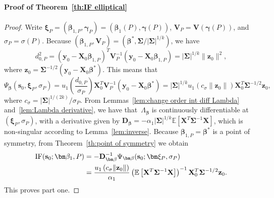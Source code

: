 \documentclass{article}
\numberwithin{equation}{section}
\theoremstyle{plain}
\newcommand{\bbeta}{\bm\beta}
\newcommand{\bxi}{\bm\xi}
\newcommand{\bgamma}{\bm\gamma}
\newcommand{\bSigma}{\mathbf{\Sigma}}
\newcommand{\by}{\mathbf{y}}
\newcommand{\bs}{\mathbf{s}}
\newcommand{\bz}{\mathbf{z}}
\newcommand{\bX}{\mathbf{X}}
\newcommand{\bV}{\mathbf{V}}
\newcommand{\bD}{\mathbf{D}}
\newcommand{\E}{\mathbb{E}}
\begin{document}
\paragraph*{Proof of Theorem~\ref{th:IF elliptical}}
\begin{proof}
Write $\bxi_P=(\bbeta_{1,P},\bgamma_P)=(\bbeta_1(P),\bgamma(P))$,
$\bV_P=\bV(\bgamma(P))$, and $\sigma_P=\sigma(P)$.
Because $(\bbeta_{1,P},\bV_P)=(\bbeta^*,\bSigma/|\bSigma|^{1/k})$,
we have
\[
d_{0,P}^2
=
(\by_0-\bX_0\bbeta_{1,P})^T\bV_P^{-1}(\by_0-\bX_0\bbeta_{1,P})
=
|\bSigma|^{1/k}\|\bz_0\|^2,
\]
where $\bz_0=\bSigma^{-1/2}(\by_0-\bX_0\bbeta^*)$.
This means that
\[
\Psi_{\bbeta}(\bs_0,\bxi_P,\sigma_P)
=
u_1\left(\frac{d_{0,P}}{\sigma_P}\right)
\bX_0^T\bV_P^{-1}(\by_0-\bX_0\bbeta^*)
=
|\bSigma|^{1/k}
u_1\left(c_\sigma\|\bz_0\|\right)
\bX_0^T\bSigma^{-1/2}\bz_0,
\]
where $c_\sigma=|\bSigma|^{1/(2k)}/\sigma_P$.
From Lemmas~\ref{lem:change order int diff Lambda} and~\ref{lem:Lambda derivative}, 
we have that~$\Lambda_{\bbeta}$ is continuously differentiable at~$(\bxi_P,\sigma_P)$, 
with a derivative given by
$\bD_{\bbeta}
=
-\alpha_1
|\bSigma|^{1/k}
\mathbb{E}\left[\mathbf{X}^T\bSigma^{-1}\mathbf{X}\right]$,
which is non-singular according to Lemma~\ref{lem:inverse}.
Because $\bbeta_{1,P}=\bbeta^*$ is a point of symmetry, from Theorem~\ref{th:point of symmetry} 
we obtain
\[
\begin{split}
\text{\rm IF}(\bs_0;\bbeta_1,P)
&=
-\bD_{\bbeta}^{-1}\Psi_{\bbeta}(\bs_0;\bxi_P,\sigma_P)\\
&=
\frac{u_1\left(c_\sigma\|\bz_0\|\right)}{\alpha_1}
\left(
\E\left[
\bX^T\bSigma^{-1}\bX
\right]
\right)^{-1}
\bX_0^T\bSigma^{-1/2}\bz_0.
\end{split}
\]
This proves part one.


\end{proof}
\end{document}
